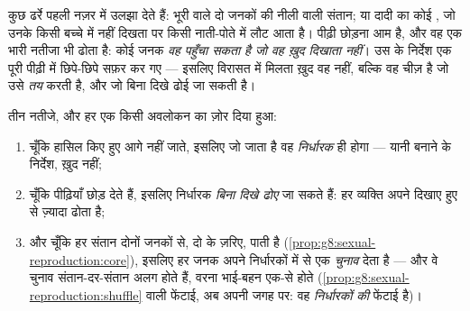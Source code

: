 \begin{example}[वे लक्षण जो पीढ़ी छोड़ देते हैं]\label{ex:g9:heredity-and-traits:skip}
कुछ ढर्रे पहली नज़र में उलझा देते हैं: भूरी  वाले दो जनकों की नीली
 वाली संतान; या दादी का कोई , जो उनके किसी बच्चे में नहीं
दिखता पर किसी नाती-पोते में लौट आता है। पीढ़ी छोड़ना आम है, और वह एक भारी
नतीजा भी ढोता है: कोई जनक \emph{वह पहुँचा सकता है जो वह ख़ुद दिखाता
नहीं}। उस  के निर्देश एक पूरी पीढ़ी में छिपे-छिपे सफ़र कर गए ---
इसलिए विरासत में मिलता ख़ुद वह  नहीं, बल्कि वह चीज़ है जो उसे
\emph{तय} करती है, और जो बिना दिखे ढोई जा सकती है।
\end{example}

\begin{proposition}\label{prop:g9:heredity-and-traits:conclusions}
तीन नतीजे, और हर एक किसी अवलोकन का ज़ोर दिया हुआ:
\begin{enumerate}
  \item चूँकि हासिल किए हुए  आगे नहीं जाते, इसलिए जो जाता है वह
        \emph{निर्धारक} ही होगा --- यानी  बनाने के निर्देश, ख़ुद
         नहीं;
  \item चूँकि  पीढ़ियाँ छोड़ देते हैं, इसलिए निर्धारक \emph{बिना
        दिखे ढोए} जा सकते हैं: हर व्यक्ति अपने दिखाए हुए से ज़्यादा
        ढोता है;
  \item और चूँकि हर संतान दोनों जनकों से, दो  के ज़रिए, पाती है
        (\cref{prop:g8:sexual-reproduction:core}), इसलिए हर जनक अपने
        निर्धारकों में से एक \emph{चुनाव} देता है --- और वे चुनाव
        संतान-दर-संतान अलग होते हैं, वरना भाई-बहन एक-से होते
        (\cref{prop:g8:sexual-reproduction:shuffle} वाली फेंटाई, अब
        अपनी जगह पर: वह \emph{निर्धारकों की} फेंटाई है)।
\end{enumerate}
\end{proposition}
\admitted

